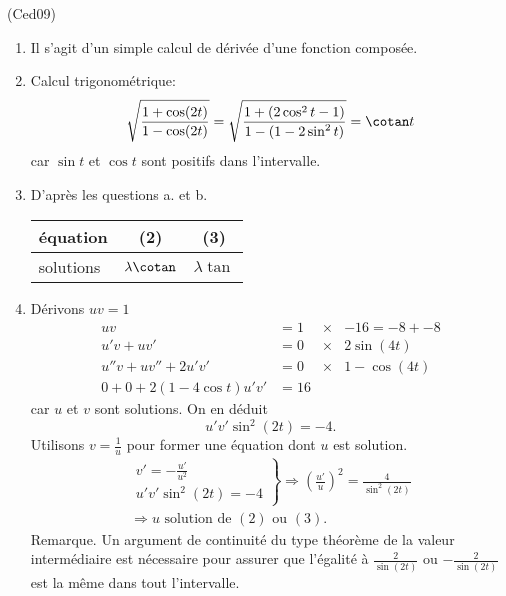 \begin{tiny}(Ced09)\end{tiny}
\begin{enumerate}
  \item Il s'agit d'un simple calcul de dérivée d'une fonction composée. 
  \item Calcul trigonométrique:
\[
\sqrt{\frac{1 + \cos(2t)}{1 - \cos(2t)}}
= \sqrt{\frac{1 + (2\cos^2 t -1)}{1 - (1-2\sin^2t)}}
= \cotan t
\]
car $\sin t$ et $\cos t$ sont positifs dans l'intervalle.

  \item D'après les questions a. et b. 
 \begin{center}
 \renewcommand{\arraystretch}{1.2}
\begin{tabular}{|l|c|c|} \hline
équation  & (2)              & (3)\\ \hline
solutions & $\lambda \cotan$ & $\lambda \tan$ \\ \hline
 \end{tabular}
 \end{center}

  \item Dérivons $uv = 1$
\[
\begin{aligned}
  uv                   &= 1 &\times& -16 = -8 +-8 \\
  u'v + uv'            &= 0 &\times& 2\sin(4t) \\
  u''v + uv'' + 2 u'v' &= 0 &\times& 1 - \cos(4t) \\ \hline
  0 + 0 + 2(1-4 \cos t) u'v' &= 16 &  &
\end{aligned}
\]
car $u$ et $v$ sont solutions. On en déduit
\[
  u'v'\sin^2(2t) = -4 .
\]
Utilisons $v = \frac{1}{u}$ pour former une équation dont $u$ est solution.
\begin{multline*}
\left.
\begin{aligned}
  v' = -\frac{u'}{u^2} \\ u'v'\sin^2(2t) = -4  
\end{aligned}
\right\rbrace 
\Rightarrow \left( \frac{u'}{u} \right)^2 = \frac{4}{\sin^2(2t)}\\
\Rightarrow 
u \text{ solution  de $(2)$ ou $(3)$}.
\end{multline*}
Remarque. Un argument de continuité du type théorème de la valeur intermédiaire est nécessaire pour assurer que l'égalité à $\frac{2}{\sin(2t)}$ ou $-\frac{2}{\sin(2t)}$ est la même dans tout l'intervalle.
\end{enumerate}
